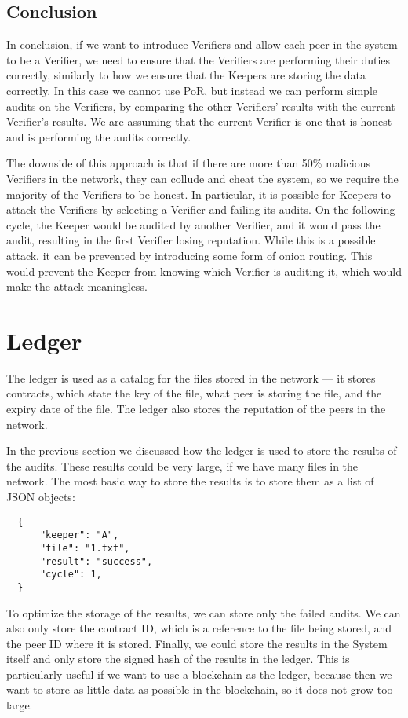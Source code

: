 \subsection{Conclusion}

In conclusion, if we want to introduce Verifiers and allow each peer in the system to be a Verifier,
we need to ensure that the Verifiers are performing their duties correctly,
similarly to how we ensure that the Keepers are storing the data correctly.
In this case we cannot use PoR, but instead we can perform simple audits on the Verifiers,
by comparing the other Verifiers' results with the current Verifier's results.
We are assuming that the current Verifier is one that is honest and is performing the audits correctly.

The downside of this approach is that if there are more than 50\% malicious Verifiers in the network,
they can collude and cheat the system,
so we require the majority of the Verifiers to be honest.
In particular, it is possible for Keepers to attack the Verifiers by
selecting a Verifier and failing its audits.
On the following cycle, the Keeper would be audited by another Verifier,
and it would pass the audit, resulting in the first Verifier losing reputation.
While this is a possible attack, it can be prevented by introducing some form of
onion routing.
This would prevent the Keeper from knowing which Verifier is auditing it,
which would make the attack meaningless.

\section{Ledger}

The ledger is used as a catalog for the files stored in the network ---
it stores contracts, which state the key of the file, what peer is storing the file,
and the expiry date of the file.
The ledger also stores the reputation of the peers in the network.

In the previous section we discussed how the ledger is used to store the results of the audits.
These results could be very large, if we have many files in the network.
The most basic way to store the results is to store them as a list of JSON objects:

\begin{verbatim}
  {
      "keeper": "A",
      "file": "1.txt",
      "result": "success",
      "cycle": 1,
  }
\end{verbatim}

To optimize the storage of the results, we can store only the failed audits.
We can also only store the contract ID, which is a reference to the file being stored, and the peer ID
where it is stored.
Finally, we could store the results in the System itself and only store the signed hash of the results in the ledger.
This is particularly useful if we want to use a blockchain as the ledger, because then we want to
store as little data as possible in the blockchain, so it does not grow too large.

